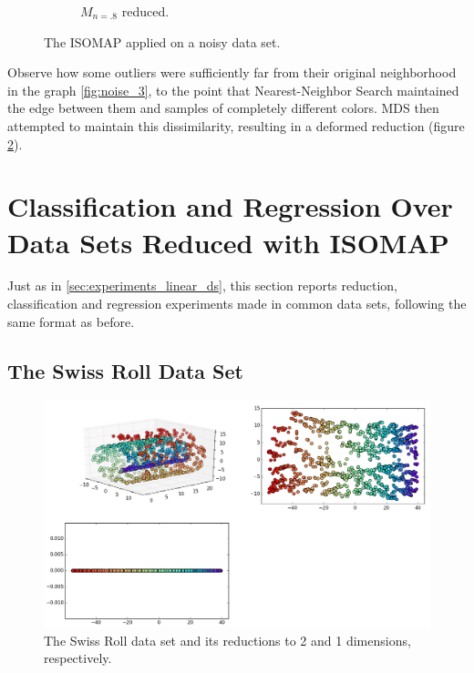 \documentclass[12pt]{report}
\begin{document}
\begin{description}
\begin{figure}[H]
\begin{subfigure}{.45\linewidth}
			\captionsetup{justification=centering}
			\caption{$M_{n=.8}$ reduced.}
			\label{fig:noise_2}
		\end{subfigure}
		\captionsetup{justification=centering}
		\caption{The ISOMAP applied on a noisy data set.}
	\end{figure}

	Observe how some outliers were sufficiently far from their original neighborhood in the graph \ref{fig:noise_3}, to the point that Nearest-Neighbor Search maintained the edge between them and samples of completely different colors. MDS then attempted to maintain this dissimilarity, resulting in a deformed reduction (figure \ref{fig:noise_2}).
\end{description}

\newpage
\section{Classification and Regression Over Data Sets Reduced with ISOMAP}

Just as in \ref{sec:experiments_linear_ds}, this section reports reduction, classification and regression experiments made in common data sets, following the same format as before.

\subsection{The Swiss Roll Data Set}

\begin{figure}[H]
	\centering
	\includegraphics[width=.95\linewidth]{experiments/iso_swiss}
	\captionsetup{justification=centering}
	\caption{The Swiss Roll data set and its reductions to 2 and 1 dimensions, respectively.}
\end{figure}
\end{document}
